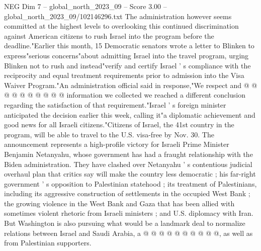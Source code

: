 \begin{textsample}{NEG Dim 7 – global\_north\_2023\_09 – Score 3.00 – global\_north\_2023\_09/102146296.txt}
The administration however seems committed at the highest levels to overlooking this continued discrimination against American citizens to rush Israel into the program before the deadline."Earlier this month, 15 Democratic senators wrote a letter to Blinken to express"serious concerns"about admitting Israel into the travel program, urging Blinken not to rush and instead"verify and certify Israel ' s compliance with the reciprocity and equal treatment requirements prior to admission into the Visa Waiver Program."An administration official said in response,"We respect and @ @ @ @ @ @ @ @ @ @ information we collected we reached a different conclusion regarding the satisfaction of that requirement."Israel ' s foreign minister anticipated the decision earlier this week, calling it"a diplomatic achievement and good news for all Israeli citizens."Citizens of Israel, the 41st country in the program, will be able to travel to the U.S. visa-free by Nov. 30.
The announcement represents a high-profile victory for Israeli Prime Minister Benjamin Netanyahu, whose government has had a fraught relationship with the Biden administration.
They have clashed over Netanyahu ' s contentious judicial overhaul plan that critics say will make the country less democratic ; his far-right government ' s opposition to Palestinian statehood ; its treatment of Palestinians, including its aggressive construction of settlements in the occupied West Bank ; the growing violence in the West Bank and Gaza that has been allied with sometimes violent rhetoric from Israeli ministers ; and U.S. diplomacy with Iran.
But Washington is also pursuing what would be a landmark deal to normalize relations between Israel and Saudi Arabia, a @ @ @ @ @ @ @ @ @ @, as well as from Palestinian supporters.

\end{textsample}

